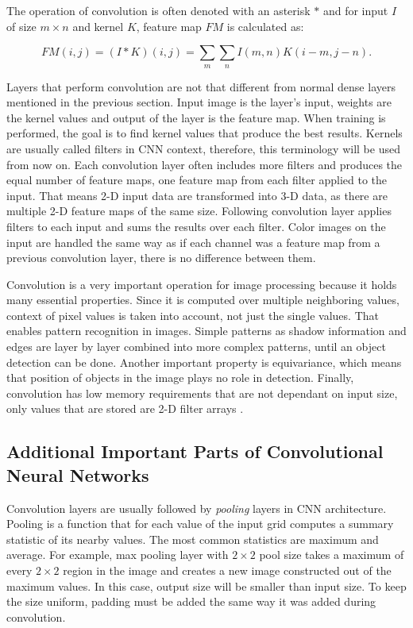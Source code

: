 The operation of convolution is often denoted with an asterisk $*$ and for input $I$ of size $m \times n$ and kernel $K$, feature map $FM$ is calculated as:

\begin{equation}
    FM(i, j) = (I * K)(i, j) = \sum\limits_m \sum\limits_n I(m, n) K(i-m, j-n).
\end{equation}

Layers that perform convolution are not that different from normal dense layers mentioned in the previous section. Input image is the layer's input, weights are the kernel values and output of the layer is the feature map. When training is performed, the goal is to find kernel values that produce the best results. Kernels are usually called filters in CNN context, therefore, this terminology will be used from now on. Each convolution layer often includes more filters and produces the equal number of feature maps, one feature map from each filter applied to the input. That means 2-D input data are transformed into 3-D data, as there are multiple 2-D feature maps of the same size. Following convolution layer applies filters to each input and sums the results over each filter. Color images on the input are handled the same way as if each channel was a feature map from a previous convolution layer, there is no difference between them.

Convolution is a very important operation for image processing because it holds many essential properties. Since it is computed over multiple neighboring values, context of pixel values is taken into account, not just the single values. That enables pattern recognition in images. Simple patterns as shadow information and edges are layer by layer combined into more complex patterns, until an object detection can be done. Another important property is equivariance, which means that position of objects in the image plays no role in detection. Finally, convolution has low memory requirements that are not dependant on input size, only values that are stored are 2-D filter arrays \cite{Goodfellow-et-al-2016}.

\subsection{\label{sec:other-cnn-ops}Additional Important Parts of Convolutional Neural Networks}

Convolution layers are usually followed by \textit{pooling} layers in CNN architecture. Pooling is a function that for each value of the input grid computes a summary statistic of its nearby values. The most common statistics are maximum and average. For example, max pooling layer with $2 \times 2$ pool size takes a maximum of every $2 \times 2$ region in the image and creates a new image constructed out of the maximum values. In this case, output size will be smaller than input size. To keep the size uniform, padding must be added the same way it was added during convolution.


